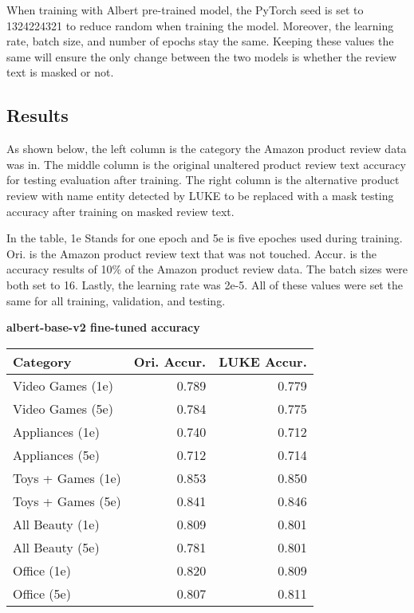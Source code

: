 \documentclass[11pt,a4paper]{article}
\begin{document}
When training with Albert pre-trained model, the PyTorch seed is set to 1324224321 to reduce random when training the model. Moreover, the learning rate, batch size, and number of epochs stay the same. Keeping these values the same will ensure the only change between the two models is whether the review text is masked or not.

\subsection{Results}

As shown below, the left column is the category the Amazon product review data was in. The middle column is the original unaltered product review text accuracy for testing evaluation after training. The right column is the alternative product review with name entity detected by LUKE to be replaced with a mask testing accuracy after training on masked review text.

In the table, 1e Stands for one epoch and 5e is five epoches used during training. Ori. is the Amazon product review text that was not touched. Accur. is the accuracy results of 10\% of the Amazon product review data. The batch sizes were both set to 16. Lastly, the learning rate was 2e-5. All of these values were set the same for all training, validation, and testing. \\

\begin{center}
\textbf{albert-base-v2 fine-tuned accuracy}
\noindent\begin{tabular}{|l|r|r|}
\hline
 Category & Ori. Accur. & LUKE Accur. \\
\hline
Video Games (1e)    & 0.789       & 0.779       \\
Video Games (5e)    & 0.784       & 0.775       \\
Appliances (1e)     & 0.740       & 0.712       \\
Appliances (5e)     & 0.712       & 0.714       \\
Toys + Games (1e)   & 0.853       & 0.850       \\
Toys + Games (5e)   & 0.841       & 0.846       \\
All Beauty (1e)     & 0.809       & 0.801       \\
All Beauty (5e)     & 0.781       & 0.801       \\
Office (1e)         & 0.820       & 0.809       \\
Office (5e)         & 0.807       & 0.811       \\
\hline
\end{tabular}
\end{center}
\end{document}
